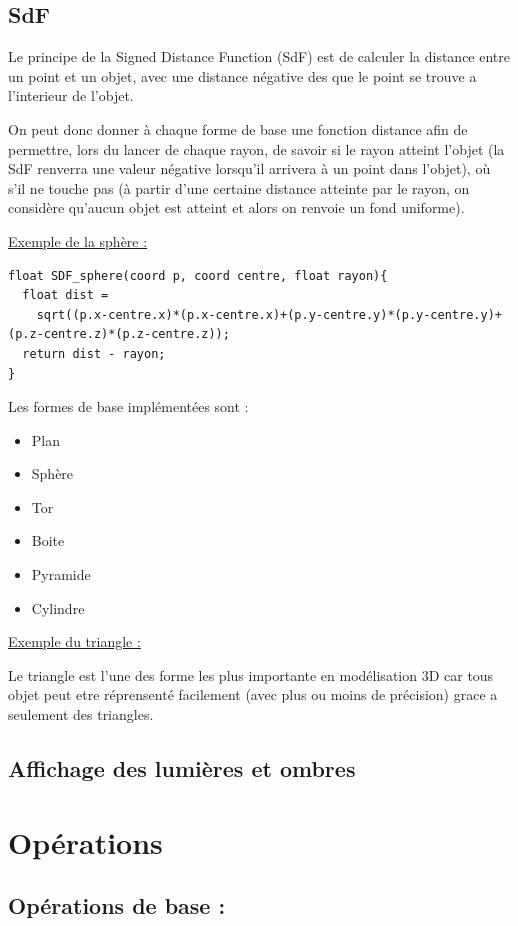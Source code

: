 \documentclass{article}
\begin{document}
\subsection{SdF}
Le principe de la Signed Distance Function (SdF) est de calculer la distance entre un point et un objet, avec une distance négative des que le point se trouve a l'interieur de l'objet.
\smallskip

On peut donc donner à chaque forme de base une fonction distance afin de permettre, lors du lancer de chaque rayon, 
de savoir si le rayon atteint l'objet (la SdF renverra une valeur négative lorsqu'il arrivera à un point dans l'objet),
où s'il ne touche pas (à partir d'une certaine distance atteinte par le rayon, on considère qu'aucun objet est atteint et alors on renvoie un fond uniforme).
\medskip 

\underline{Exemple de la sphère :}
\begin{lstlisting}
float SDF_sphere(coord p, coord centre, float rayon){
  float dist = 
    sqrt((p.x-centre.x)*(p.x-centre.x)+(p.y-centre.y)*(p.y-centre.y)+(p.z-centre.z)*(p.z-centre.z));
  return dist - rayon;
}
\end{lstlisting}
\medskip 

Les formes de base implémentées sont : 
\begin{itemize}
    \item Plan
    \item Sphère
    \item Tor
    \item Boite
    \item Pyramide 
    \item Cylindre
\end{itemize}

\bigskip
\underline{Exemple du triangle :}
\medskip

Le triangle est l'une des forme les plus importante en modélisation 3D car tous objet peut etre réprensenté facilement (avec plus ou moins de précision) grace a seulement des triangles.

\subsection{Affichage des lumières et ombres}

\section{Opérations}
\subsection{Opérations de base :}
\end{document}
